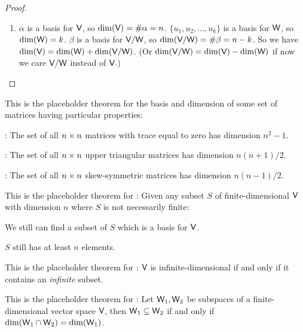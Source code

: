 \begin{proof}
\begin{enumerate}
\item
\(\alpha\) is a basis for \(\textsf{V}\), so \(\dim(\textsf{V}) = \#\alpha = n\).
\(\{ u_1, u_2, ..., u_k \}\) is a basis for \(\textsf{W}\), so \(\dim(\textsf{W}) = k\).
\(\beta\) is a basis for \(\textsf{V}/\textsf{W}\), so \(\dim(\textsf{V}/\textsf{W}) = \#\beta = n - k\).
So we have \(\dim(\textsf{V}) = \dim(\textsf{W}) + \dim(\textsf{V}/\textsf{W})\).
(Or \(\dim(\textsf{V}/\textsf{W}) = \dim(\textsf{V}) - \dim(\textsf{W})\) if now we care \(\textsf{V}/\textsf{W}\) instead of \(\textsf{V}\).)
\end{enumerate}
\end{proof}

\begin{additional theorem} \label{athm 1.19}
This is the placeholder theorem for the basis and dimension of some set of matrices having particular properties:

 : The set of all \(n \times n\) matrices with trace equal to zero has dimension \(n^2 - 1\).

 : The set of all \(n \times n\) upper triangular matrices has dimension \(n(n + 1)/2\).

 : The set of all \(n \times n\) skew-symmetric matrices has dimension \(n(n - 1)/2\).
\end{additional theorem}

\begin{additional theorem} \label{athm 1.20}
This is the placeholder theorem for : Given any subset \(S\) of finite-dimensional \(\textsf{V}\) with dimension \(n\) where \(S\) is not necessarily finite:

 We still can find a subset of \(S\) which is a basis for \(\textsf{V}\).

 \(S\) still has at least \(n\) elements.
\end{additional theorem}

\begin{additional theorem} \label{athm 1.21}
This is the placeholder theorem for : \(\textsf{V}\) is infinite-dimensional if and only if it contains an \emph{infinite} \LID{} subset.
\end{additional theorem}

\begin{additional theorem} \label{athm 1.22}
This is the placeholder theorem for : Let \(\textsf{W}_1, \textsf{W}_2\) be subspaces of a finite-dimensional vector space \(\textsf{V}\), then \(\textsf{W}_1 \subseteq \textsf{W}_2\) if and only if \(\dim(\textsf{W}_1 \cap \textsf{W}_2) = \dim(\textsf{W}_1)\).
\end{additional theorem}

